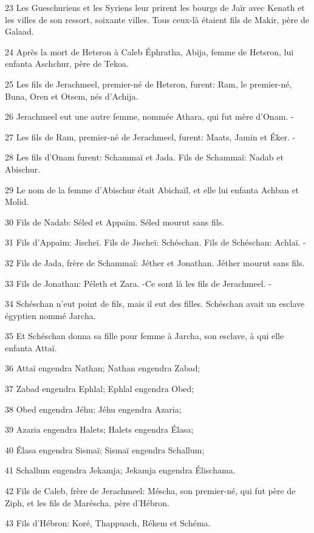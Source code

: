 \par 23 Les Gueschuriens et les Syriens leur prirent les bourgs de Jaïr avec Kenath et les villes de son ressort, soixante villes. Tous ceux-là étaient fils de Makir, père de Galaad.
\par 24 Après la mort de Hetsron à Caleb Éphratha, Abija, femme de Hetsron, lui enfanta Aschchur, père de Tekoa.
\par 25 Les fils de Jerachmeel, premier-né de Hetsron, furent: Ram, le premier-né, Buna, Oren et Otsem, nés d'Achija.
\par 26 Jerachmeel eut une autre femme, nommée Athara, qui fut mère d'Onam. -
\par 27 Les fils de Ram, premier-né de Jerachmeel, furent: Maats, Jamin et Éker. -
\par 28 Les fils d'Onam furent: Schammaï et Jada. Fils de Schammaï: Nadab et Abischur.
\par 29 Le nom de la femme d'Abischur était Abichaïl, et elle lui enfanta Achban et Molid.
\par 30 Fils de Nadab: Séled et Appaïm. Séled mourut sans fils.
\par 31 Fils d'Appaïm: Jischeï. Fils de Jischeï: Schéschan. Fils de Schéschan: Achlaï. -
\par 32 Fils de Jada, frère de Schammaï: Jéther et Jonathan. Jéther mourut sans fils.
\par 33 Fils de Jonathan: Péleth et Zara. -Ce sont là les fils de Jerachmeel. -
\par 34 Schéschan n'eut point de fils, mais il eut des filles. Schéschan avait un esclave égyptien nommé Jarcha.
\par 35 Et Schéschan donna sa fille pour femme à Jarcha, son esclave, à qui elle enfanta Attaï.
\par 36 Attaï engendra Nathan; Nathan engendra Zabad;
\par 37 Zabad engendra Ephlal; Ephlal engendra Obed;
\par 38 Obed engendra Jéhu; Jéhu engendra Azaria;
\par 39 Azaria engendra Halets; Halets engendra Élasa;
\par 40 Élasa engendra Sismaï; Sismaï engendra Schallum;
\par 41 Schallum engendra Jekamja; Jekamja engendra Élischama.
\par 42 Fils de Caleb, frère de Jerachmeel: Méscha, son premier-né, qui fut père de Ziph, et les fils de Maréscha, père d'Hébron.
\par 43 Fils d'Hébron: Koré, Thappuach, Rékem et Schéma.
